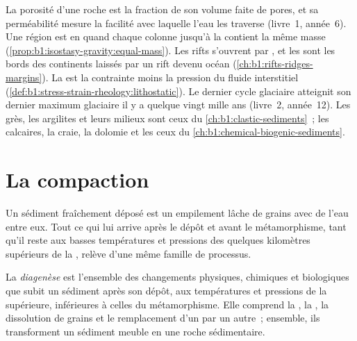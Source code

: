 \begin{recall}
La porosité d'une roche est la fraction de son volume faite de pores, et sa
perméabilité mesure la facilité avec laquelle l'eau les traverse (livre~1, année~6).
Une région est en  quand chaque colonne jusqu'à la  contient
la même masse (\cref{prop:b1:isostasy-gravity:equal-mass}). Les rifts s'ouvrent par , et les  sont les bords des continents laissés par un
rift devenu océan (\cref{ch:b1:rifts-ridges-margins}). La 
est la contrainte moins la pression du fluide interstitiel
(\cref{def:b1:stress-strain-rheology:lithostatic}). Le dernier cycle glaciaire
atteignit son dernier maximum glaciaire il y a quelque vingt mille ans (livre~2,
année~12). Les grès, les argilites et leurs milieux sont ceux du
\cref{ch:b1:clastic-sediments}~; les calcaires, la craie, la dolomie et les  ceux
du \cref{ch:b1:chemical-biogenic-sediments}.
\end{recall}

\section{La compaction}\label{sec:b1:diagenesis-basins:compaction}

Un sédiment fraîchement déposé est un empilement lâche de grains avec de l'eau entre eux.
Tout ce qui lui arrive après le dépôt et avant le métamorphisme, tant qu'il
reste aux basses températures et pressions des quelques kilomètres supérieurs de la
, relève d'une même famille de processus.

\begin{definition}[Diagenèse]\label{def:b1:diagenesis-basins:diagenesis}
La \emph{diagenèse} est l'ensemble des changements physiques, chimiques et
biologiques que subit un sédiment après son dépôt, aux
températures et pressions de la  supérieure, inférieures à celles du métamorphisme. Elle
comprend la , la , la dissolution de grains et le
remplacement d'un  par un autre~; ensemble, ils transforment un sédiment meuble en
une roche sédimentaire.
\end{definition}

